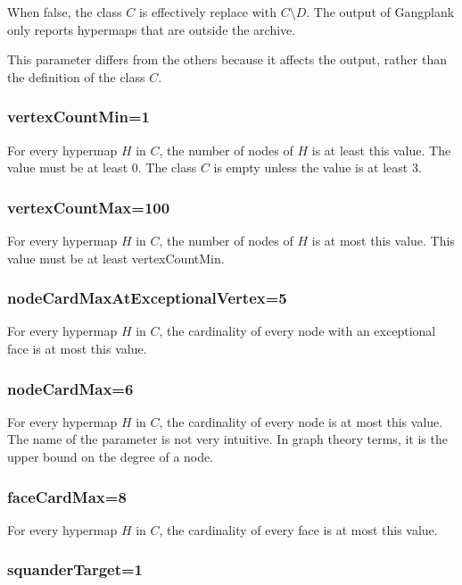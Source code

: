 When false, the class $C$ is effectively replace with $C\setminus D$.  The output
of Gangplank only reports hypermaps that are outside the archive.

This parameter differs from the others because it affects the output, rather than the
definition of the class $C$.

\subsubsection{vertexCountMin=1}

For every hypermap $H$ in $C$, the number of nodes of $H$ is at least this value.
The value must be at least $0$.  The class $C$ is empty unless the value is at least $3$.

\subsubsection{vertexCountMax=100}

For every hypermap $H$ in $C$, the number of nodes of $H$ is at most this value.
This value must be at least vertexCountMin.

\subsubsection{nodeCardMaxAtExceptionalVertex=5}

For every hypermap $H$ in $C$, the cardinality of every node with an exceptional face
is at most this value.

\subsubsection{nodeCardMax=6}

For every hypermap $H$ in $C$, the cardinality of every node is at most
this value.  The name of the parameter is not very intuitive.  In
graph theory terms, it is the upper bound on the degree of a node.

\subsubsection{faceCardMax=8}

For every hypermap $H$ in $C$, the cardinality of every face is at most
this value.  

\subsubsection{squanderTarget=1}

